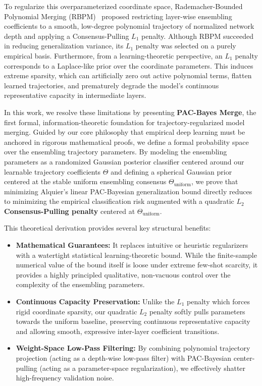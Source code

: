 To regularize this overparameterized coordinate space, Rademacher-Bounded Polynomial Merging (RBPM)~\cite{trial5_submission2} proposed restricting layer-wise ensembling coefficients to a smooth, low-degree polynomial trajectory of normalized network depth and applying a Consensus-Pulling $L_1$ penalty. Although RBPM succeeded in reducing generalization variance, its $L_1$ penalty was selected on a purely empirical basis. Furthermore, from a learning-theoretic perspective, an $L_1$ penalty corresponds to a Laplace-like prior over the coordinate parameters. This induces extreme sparsity, which can artificially zero out active polynomial terms, flatten learned trajectories, and prematurely degrade the model's continuous representative capacity in intermediate layers.

In this work, we resolve these limitations by presenting \textbf{PAC-Bayes Merge}, the first formal, information-theoretic foundation for trajectory-regularized model merging. Guided by our core philosophy that empirical deep learning must be anchored in rigorous mathematical proofs, we define a formal probability space over the ensembling trajectory parameters. By modeling the ensembling parameters as a randomized Gaussian posterior classifier centered around our learnable trajectory coefficients $\Theta$ and defining a spherical Gaussian prior centered at the stable uniform ensembling consensus $\Theta_{\text{uniform}}$, we prove that minimizing Alquier's linear PAC-Bayesian generalization bound directly reduces to minimizing the empirical classification risk augmented with a quadratic \textbf{$L_2$ Consensus-Pulling penalty} centered at $\Theta_{\text{uniform}}$. 

This theoretical derivation provides several key structural benefits:
\begin{itemize}
    \item \textbf{Mathematical Guarantees:} It replaces intuitive or heuristic regularizers with a watertight statistical learning-theoretic bound. While the finite-sample numerical value of the bound itself is loose under extreme few-shot scarcity, it provides a highly principled qualitative, non-vacuous control over the complexity of the ensembling parameters.
    \item \textbf{Continuous Capacity Preservation:} Unlike the $L_1$ penalty which forces rigid coordinate sparsity, our quadratic $L_2$ penalty softly pulls parameters towards the uniform baseline, preserving continuous representative capacity and allowing smooth, expressive inter-layer coefficient transitions.
    \item \textbf{Weight-Space Low-Pass Filtering:} By combining polynomial trajectory projection (acting as a depth-wise low-pass filter) with PAC-Bayesian center-pulling (acting as a parameter-space regularization), we effectively shatter high-frequency validation noise.
\end{itemize}

